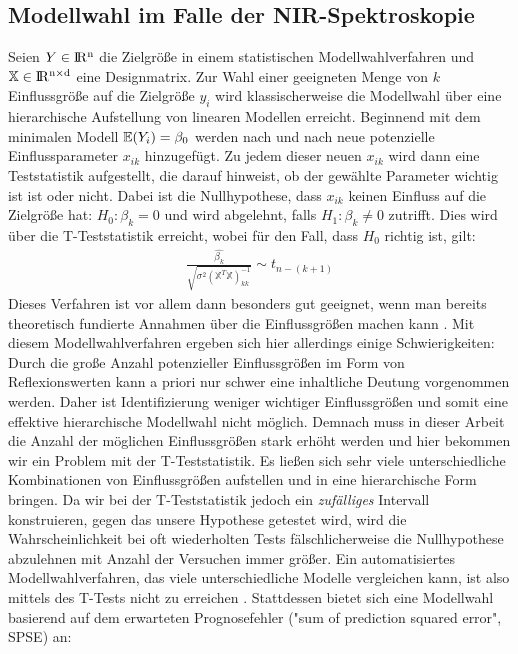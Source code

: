 	\subsection{Modellwahl im Falle der NIR-Spektroskopie}
	\label{ssec:modellwahl_nir}
	Seien $Y\in \rm I\!R^{n}$ die Zielgröße in einem statistischen Modellwahlverfahren und $\mathbb{X} \in \rm I\!R^{n \times d}$ eine Designmatrix.
	Zur Wahl einer geeigneten Menge von $k$ Einflussgröße auf die Zielgröße $y_i$  wird klassischerweise die Modellwahl über eine hierarchische Aufstellung von linearen Modellen erreicht.
	Beginnend mit dem minimalen Modell $\operatorname{\mathbb{E}}(Y_i) = \beta_0$ werden nach und nach neue potenzielle Einflussparameter $x_{ik}$ hinzugefügt.
	Zu jedem dieser neuen $x_{ik}$ wird dann eine Teststatistik aufgestellt, die darauf hinweist, ob der gewählte Parameter wichtig ist ist oder nicht.
	Dabei ist die Nullhypothese, dass $x_{ik}$ keinen Einfluss auf die Zielgröße hat: $ H_0 : \beta_k = 0$ und wird abgelehnt, falls $H_1 : \beta_k \neq 0$ zutrifft.
	Dies wird über die T-Teststatistik erreicht, wobei für den Fall, dass $H_0$ richtig ist, gilt:
	\begin{align*}
		\frac{\hat{\beta_k}}{\sqrt{\sigma^2(\mathbb{X}^T\mathbb{X})^{-1}_{kk}}} \sim t_{n-(k+1)}
	\end{align*}
	Dieses Verfahren ist vor allem dann besonders gut geeignet, wenn man bereits theoretisch fundierte Annahmen über die Einflussgrößen machen kann \cite{Schumacher.2019}.
	Mit diesem Modellwahlverfahren ergeben sich hier allerdings einige Schwierigkeiten:
	Durch die große Anzahl potenzieller Einflussgrößen im Form von Reflexionswerten kann a priori nur schwer eine inhaltliche Deutung vorgenommen werden.
	Daher ist Identifizierung weniger wichtiger Einflussgrößen und somit eine effektive hierarchische Modellwahl nicht möglich.
	Demnach muss in dieser Arbeit die Anzahl der möglichen Einflussgrößen stark erhöht werden und hier bekommen wir ein Problem mit der T-Teststatistik.
	Es ließen sich sehr viele unterschiedliche Kombinationen von Einflussgrößen aufstellen und in eine hierarchische Form bringen.
	Da wir bei der T-Teststatistik jedoch ein \textit{zufälliges} Intervall konstruieren, gegen das unsere Hypothese getestet wird, wird die Wahrscheinlichkeit bei oft wiederholten Tests fälschlicherweise die Nullhypothese abzulehnen mit Anzahl der Versuchen immer größer.
	Ein automatisiertes Modellwahlverfahren, das viele unterschiedliche Modelle vergleichen kann, ist also mittels des T-Tests nicht zu erreichen \cite{Schumacher.2019}.
	Stattdessen bietet sich eine Modellwahl basierend auf dem erwarteten Prognosefehler ("sum of prediction squared error", SPSE) an:
